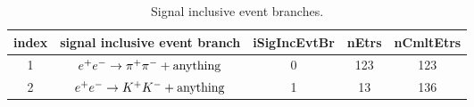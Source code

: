 \documentclass[landscape]{article}
\begin{document}
\clearpage

\begin{table}[htbp!]
\caption{Signal inclusive event branches.}
\small
\centering
\begin{tabular}{|c|c|c|c|c|}
\hline
index & signal inclusive event branch & iSigIncEvtBr & nEtrs & nCmltEtrs \\
\hline
1 & $ e^{+} e^{-} \rightarrow \pi^{+} \pi^{-}  + \rm{anything}$ & 0 & 123 & 123 \\
\hline
2 & $ e^{+} e^{-} \rightarrow K^{+} K^{-}  + \rm{anything}$ & 1 & 13 & 136 \\
\hline
\end{tabular}
\end{table}
\end{document}
